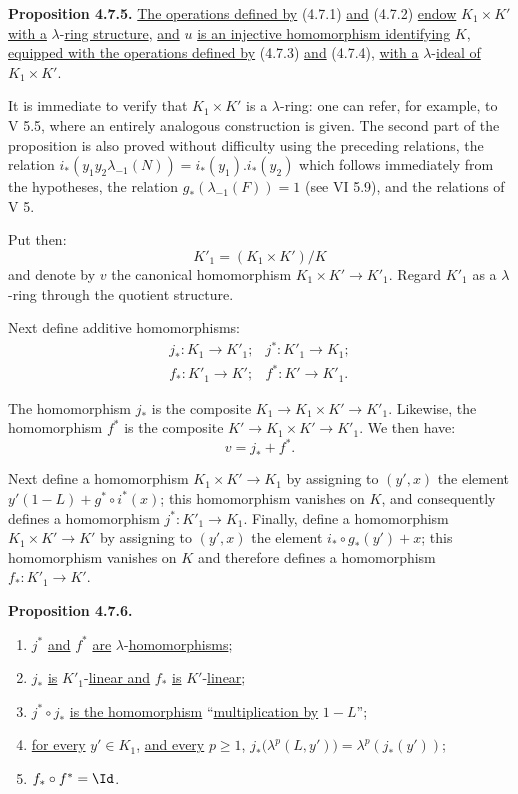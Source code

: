 \textbf{Proposition 4.7.5.} \uline{The operations defined by} (4.7.1) \uline{and} (4.7.2) \uline{endow} \(K_1\times K'\) \uline{with a} \(\lambda\)-\uline{ring structure}, \uline{and} \(u\) \uline{is an injective homomorphism identifying} \(K\), \uline{equipped with the operations defined by} (4.7.3) \uline{and} (4.7.4), \uline{with a} \(\lambda\)-\uline{ideal of} \(K_1\times K'\).

It is immediate to verify that \(K_1\times K'\) is a \(\lambda\)-ring: one can refer, for example, to V 5.5, where an entirely analogous construction is given. The second part of the proposition is also proved without difficulty using the preceding relations, the relation \(i_*(y_1y_2\lambda_{-1}(N))=i_*(y_1).i_*(y_2)\) which follows immediately from the hypotheses, the relation \(g_*(\lambda_{-1}(F))=1\) (see VI 5.9), and the relations of V 5.

Put then:
\[
  K'_1=(K_1\times K')/K
\]
and denote by \(v\) the canonical homomorphism \(K_1\times K'\to K'_1\). Regard \(K'_1\) as a \(\lambda\)-ring through the quotient structure.

Next define additive homomorphisms:
\[
\begin{array}{llll}
j_*:K_1\to K'_1; & j^*:K'_1\to K_1; \\
f_*:K'_1\to K'; & f^*:K'\to K'_1 .
\end{array}
\]

The homomorphism \(j_*\) is the composite \(K_1\to K_1\times K'\to K'_1\). Likewise, the homomorphism \(f^*\) is the composite \(K'\to K_1\times K'\to K'_1\). We then have:
\[
  v=j_*+f^*.
\]

%
Next define a homomorphism \(K_1\times K'\to K_1\) by assigning to \((y',x)\) the element \(y'(1-L)+g^*\circ i^*(x)\); this homomorphism vanishes on \(K\), and consequently defines a homomorphism \(j^*:K'_1\longrightarrow K_1\). Finally, define a homomorphism \(K_1\times K'\to K'\) by assigning to \((y',x)\) the element \(i_*\circ g_*(y')+x\); this homomorphism vanishes on \(K\) and therefore defines a homomorphism \(f_*:K'_1\longrightarrow K'\).

\textbf{Proposition 4.7.6.}
\begin{enumerate}[label=\roman*)]
\item \(j^*\) \uline{and} \(f^*\) \uline{are} \(\lambda\)-\uline{homomorphisms};
\item \(j_*\) \uline{is} \(K'_1\)-\uline{linear and} \(f_*\) \uline{is} \(K'\)-\uline{linear};
\item \(j^*\circ j_*\) \uline{is the homomorphism} ``\uline{multiplication by} \(1-L\)'';
\item \uline{for every} \(y'\in K_1\), \uline{and every} \(p\ge1\), \(j_*\bigl(\lambda^p(L,y')\bigr)=\lambda^p(j_*(y'))\);
\item \(f_*\circ f^*=\Id\).
\end{enumerate}

